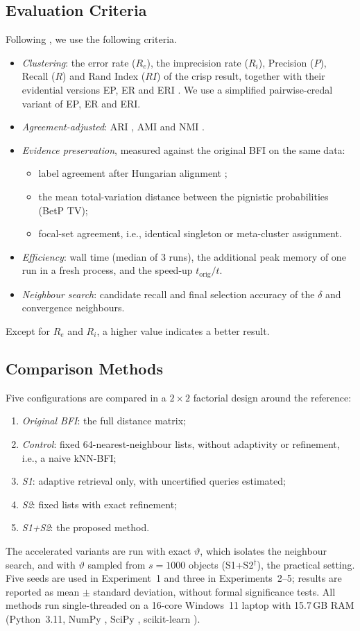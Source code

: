 \documentclass[journal]{IEEEtran}
\begin{document}
\subsection{Evaluation Criteria}
Following \cite{zhang2025}, we use the following criteria.
\begin{itemize}
\item \emph{Clustering}: the error rate ($R_e$), the imprecision rate ($R_i$), Precision ($P$), Recall ($R$) and Rand Index ($RI$) of the crisp result, together with their evidential versions EP, ER and ERI \cite{zhang2025survey, liu2015}. We use a simplified pairwise-credal variant of EP, ER and ERI.
\item \emph{Agreement-adjusted}: ARI \cite{hubert1985}, AMI and NMI \cite{strehl2002}.
\item \emph{Evidence preservation}, measured against the original BFI on the same data:
\begin{itemize}
\item label agreement after Hungarian alignment \cite{kuhn1955};
\item the mean total-variation distance between the pignistic probabilities (BetP TV);
\item focal-set agreement, i.e., identical singleton or meta-cluster assignment.
\end{itemize}
\item \emph{Efficiency}: wall time (median of 3 runs), the additional peak memory of one run in a fresh process, and the speed-up $t_{\mathrm{orig}}/t$.
\item \emph{Neighbour search}: candidate recall and final selection accuracy of the $\delta$ and convergence neighbours.
\end{itemize}
Except for $R_e$ and $R_i$, a higher value indicates a better result.

\subsection{Comparison Methods}
Five configurations are compared in a $2\times2$ factorial design around the reference:
\begin{enumerate}
\item \emph{Original BFI}: the full distance matrix;
\item \emph{Control}: fixed 64-nearest-neighbour lists, without adaptivity or refinement, i.e., a naive kNN-BFI;
\item \emph{S1}: adaptive retrieval only, with uncertified queries estimated;
\item \emph{S2}: fixed lists with exact refinement;
\item \emph{S1+S2}: the proposed method.
\end{enumerate}
The accelerated variants are run with exact $\vartheta$, which isolates the neighbour search, and with $\vartheta$ sampled from $s=1000$ objects (S1+S2$^{\dagger}$), the practical setting. Five seeds are used in Experiment~1 and three in Experiments~2--5; results are reported as mean $\pm$ standard deviation, without formal significance tests. All methods run single-threaded on a 16-core Windows~11 laptop with 15.7\,GB RAM (Python~3.11, NumPy \cite{harris2020}, SciPy \cite{virtanen2020}, scikit-learn \cite{pedregosa2011}).
\end{document}
